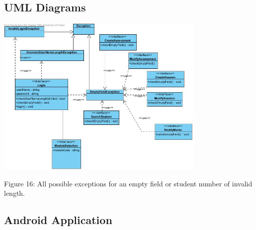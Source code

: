 \documentclass[a4paper]{article}
\begin{document}
\subsection*{UML Diagrams}
\includegraphics[width=380px]{Images/WEBUML.jpg}
\begin{center}
Figure 16: All possible exceptions for an empty field or student number of invalid length.
\end{center}

\subsection{Android Application}
\end{document}
